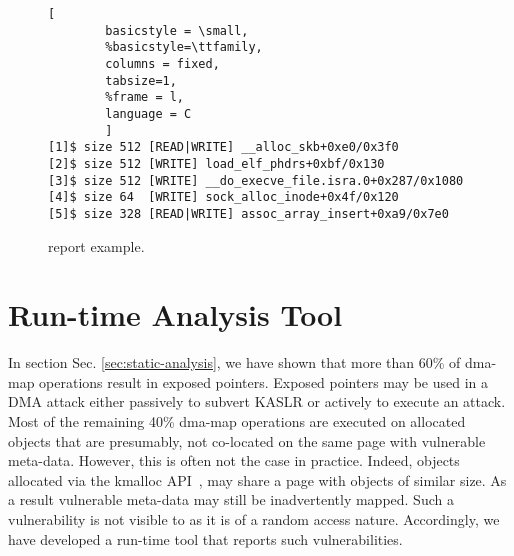 \begin{figure}[t]
\begin{adjustbox}{width=\linewidth}
        \begin{lstlisting}[
        basicstyle = \small,
        %basicstyle=\ttfamily,
        columns = fixed,
        tabsize=1,
        %frame = l,
        language = C
        ]
[1]$ size 512 [READ|WRITE] __alloc_skb+0xe0/0x3f0
[2]$ size 512 [WRITE] load_elf_phdrs+0xbf/0x130
[3]$ size 512 [WRITE] __do_execve_file.isra.0+0x287/0x1080
[4]$ size 64  [WRITE] sock_alloc_inode+0x4f/0x120
[5]$ size 328 [READ|WRITE] assoc_array_insert+0xa9/0x7e0
        \end{lstlisting}
\end{adjustbox}
        \caption{\dkasan report example.}
        \label{fig:dkasan-report}
\end{figure}


\section{Run-time Analysis Tool}\label{sec:dma-kasan} 

In section Sec. \ref{sec:static-analysis}, we have shown that more than 60\% of dma-map operations result in exposed pointers. Exposed pointers may be used in a DMA attack either passively to subvert KASLR or actively to execute an attack. Most of the remaining 40\% dma-map operations are executed on allocated objects that are presumably, not co-located on the same page with vulnerable meta-data. However, this is often not the case in practice.
Indeed, objects allocated via the kmalloc API~\cite{Cor07}, may share a page with objects of similar size. As a result vulnerable meta-data may still be inadvertently mapped. 
%
Such a vulnerability is not visible to \tool as it is of a random access nature. Accordingly, we have developed a run-time tool that reports such vulnerabilities. 

